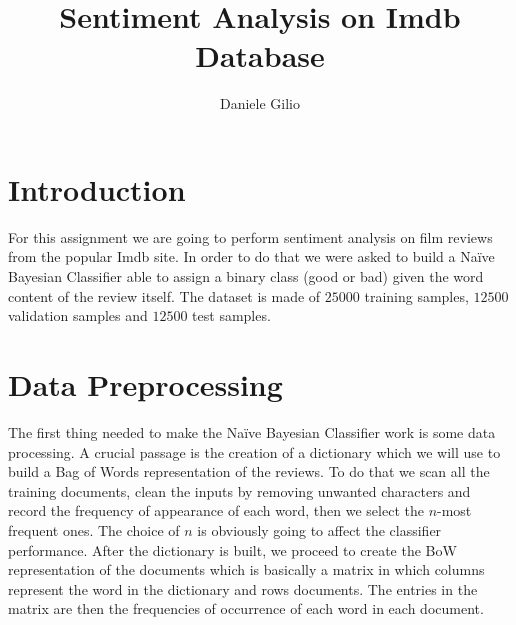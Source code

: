 \documentclass[10pt,a4paper]{report}
\author{Daniele Gilio}
\title{Sentiment Analysis on Imdb Database}
\begin{document}
\maketitle
\section{Introduction}
For this assignment we are going to perform sentiment analysis on film reviews from the popular Imdb site. In order to do that we were asked to build a Na\"{i}ve Bayesian Classifier able to assign a binary class (good or bad) given the word content of the review itself. The dataset is made of $25000$ training samples, $12500$ validation samples and $12500$ test samples.
\section{Data Preprocessing}
The first thing needed to make the Na\"{i}ve Bayesian Classifier work is some data processing. A crucial passage is the creation of a dictionary which we will use to build a Bag of Words representation of the reviews. To do that we scan all the training documents, clean the inputs by removing unwanted characters and record the frequency of appearance of each word, then we select the $n$-most frequent ones. The choice of $n$ is obviously going to affect the classifier performance. After the dictionary is built, we proceed to create the BoW representation of the documents which is basically a matrix in which columns represent the word in the dictionary and rows documents. The entries in the matrix are then the frequencies of occurrence of each word in each document. 
\end{document}
